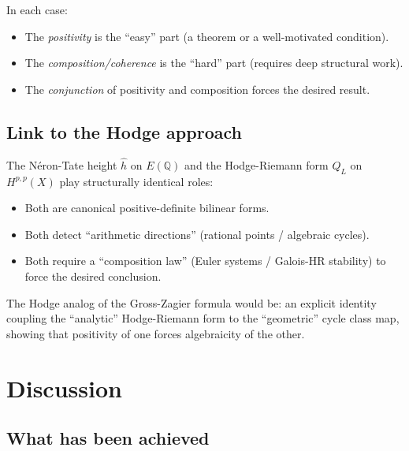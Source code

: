 \documentclass[aps,prd,twocolumn,superscriptaddress,nofootinbib]{revtex4-2}
\theoremstyle{definition}
\theoremstyle{remark}
\begin{document}
In each case:
\begin{itemize}
\item The \textit{positivity} is the ``easy'' part (a theorem or a well-motivated condition).
\item The \textit{composition/coherence} is the ``hard'' part (requires deep structural work).
\item The \textit{conjunction} of positivity and composition forces the desired result.
\end{itemize}

\subsection{Link to the Hodge approach}

The N\'eron-Tate height $\hat{h}$ on $E(\mathbb{Q})$ and the Hodge-Riemann form $Q_L$ on $H^{p,p}(X)$ play structurally identical roles:
\begin{itemize}
\item Both are canonical positive-definite bilinear forms.
\item Both detect ``arithmetic directions'' (rational points / algebraic cycles).
\item Both require a ``composition law'' (Euler systems / Galois-HR stability) to force the desired conclusion.
\end{itemize}

The Hodge analog of the Gross-Zagier formula would be: an explicit identity coupling the ``analytic'' Hodge-Riemann form to the ``geometric'' cycle class map, showing that positivity of one forces algebraicity of the other.


\section{Discussion}
\label{sec:discussion}

\subsection{What has been achieved}
\end{document}
